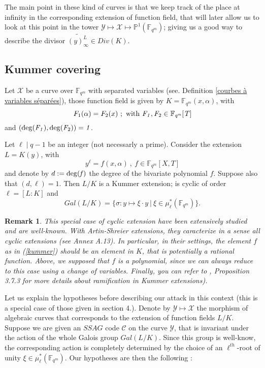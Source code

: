 \documentclass[10pt]{article}
\newtheorem{rq1}{Remark}[]
\newcommand{\s}{\vspace{0.3cm}}
\newcommand{\cd}{\cdot}
\newcommand{\fqm}{\mathbb{F}_{q^m}}
\newcommand{\X}{\mathcal{X}}
\newcommand{\Y}{\mathcal{Y}}
\begin{document}
\s

The main point in these kind of curves is that we keep track of the place at infinity in the corresponding extension of function field, that will later allow us to look at this point in the tower $\Y \longmapsto \X \longmapsto \mathbb{P}^1(\fqm)$; giving us a good way to describe the divisor $\widetilde{(y)_{\infty}^L} \in Div(K)$.


\s

\subsection{Kummer covering}

\s

Let $\X$ be a curve over $\fqm$ with separated variables (see. Definition \ref{courbes à variables séparées}), those function field is given by $K=\fqm(x,\alpha)$, with
\[F_1(\alpha) = F_2(x) \ ; \ \rm {with} \ \it F_1,F_{\rm 2} \in \fqm[T] \]
and $(\rm{deg}\it(F_1),\rm{deg}\it(F_{\rm{2}}))=1$. 

\s

Let $\ell \mid q-1$ be an integer (not necessarly a prime). Consider the extension $L=K(y)$, with
\begin{equation} \label{kummer}
y^{\ell} = f(x,\alpha) \ , \ f \in \fqm[X,T] 
\end{equation}
and denote by $d:=\rm{deg}\it(f)$ the degree of the bivariate polynomial $f$. Suppose also that $(d,\ell)=1$. Then $L/K$ is a Kummer extension; is cyclic of order $\ell=[L:K]$ and 
\[Gal(L/K) = \{ \sigma : y \mapsto \xi \cd y \ | \ \xi \in \mu^*_{\ell}(\fqm)\}.\] 

\s

\begin{rq1} \label{pk des polynômes}
This special case of cyclic extension have been extensively studied and are well-known. With Artin-Shreier extensions, they caracterize in a sense all cyclic extensions (see \cite{Sti} Annex A.13). In particular, in their settings, the element $f$ as in (\ref{kummer}) should be an element in $K$, that is potentially a rational function. Above, we supposed that $f$ is a polynomial, since we can always reduce to this case using a change of variables. Finally, you can refer to \cite{Sti}, Proposition 3.7.3 for more details about ramification in Kummer extensions).
\end{rq1}

\s

Let us explain the hypotheses before describing our attack in this context (this is a special case of those given in section 4.). Denote by $\Y \longmapsto \X$ the morphism of algebraic curves that corresponds to the extension of function fields $L/K$. Suppose we are given an $SSAG$ code $\mathcal{C}$ on the curve $\Y$, that is invariant under the action of the whole Galois group $Gal(L/K)$. Since this group is well-know, the corresponding action is completely determined by the choice of an $\ell^{th}$-root of unity $\xi \in \mu^*_{\ell}(\fqm)$. Our hypotheses are then the following :
\end{document}
